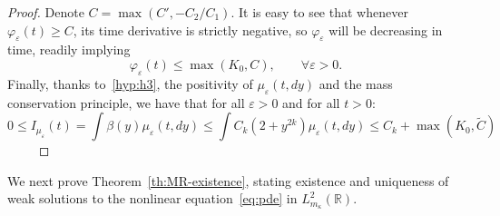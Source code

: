 \documentclass[onefignum,onetabnum]{siamart190516}
\newcommand{\R}{\mathbb{R}}
\newcommand{\1}{\mathbbm{1}}
\newcommand{\eps}{\varepsilon}
\begin{document}
\begin{proof}
Denote $C=\max(C',-C_2/C_1)$. It is easy to see that whenever $\varphi_\eps(t)\geq C$, its time derivative is strictly negative, so $\varphi_\eps$ will be decreasing in time, readily implying
 $$
 \varphi_\eps(t)\leq \max\left(K_0,C\right),\qquad \forall \eps>0.
 $$
%
%
 Finally, thanks to~\eqref{hyp:h3}, the positivity of $\mu_\eps(t,dy)$ and the mass conservation principle, we have that for all $\eps>0$ and for all $t>0$:
 $$
0\leq I_{\mu_\eps}(t) = \int\beta(y)\mu_\eps(t,dy) \leq \int C_k\left(2+y^{2k}\right)\mu_\eps(t,dy)\leq C_k+\max\left(K_0,\tilde C\right)
 $$
 $\qquad$
 \end{proof}
 
We next prove Theorem~\ref{th:MR-existence}, stating existence and uniqueness of weak solutions to the nonlinear equation~\eqref{eq:pde} in $L^2_{m_\kappa}(\R)$.
\end{document}
